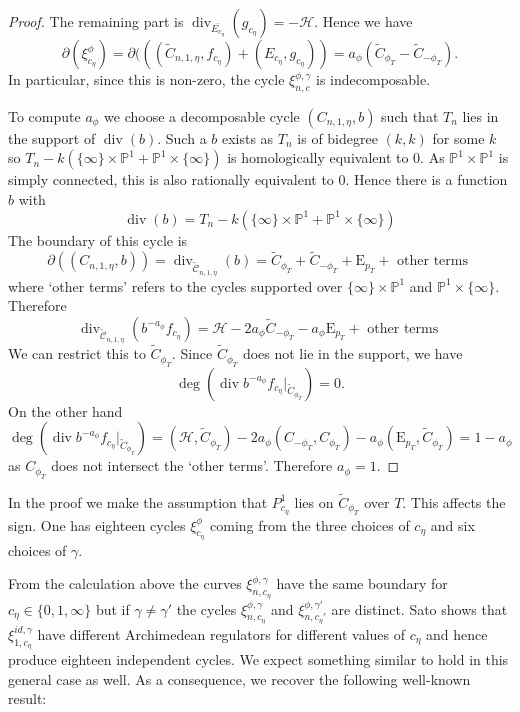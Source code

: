 \documentclass[11pt,a4paper]{article}
\newcommand {\UH}{{\mathcal H}}
\newcommand {\CP}{{\mathds P}}
\newcommand {\RE}{{{\mathrm E}}}
\newcommand {\TCC}{\tilde{\mathcal C}}
\newcommand {\CPP}{\CP^1 \times \CP^1}
\newcommand{\TC}{\tilde{C}}
\def\div{\operatorname{div}}
\def\deg{\operatorname{deg}}
\begin{document}
\begin{proof}
The remaining part is $\div_{\bar{E_{c_{\eta}}}}(g_{c_{\eta}})=-\UH$. Hence we have 
%
$$\partial (\xi^{\phi}_{c_{\eta}})=\partial( ((\TC_{n,1,\eta},f_{c_{\eta}})+(E_{c_{\eta}},g_{c_{\eta}}))=a_{\phi}(\TC_{\phi_T}-\TC_{-\phi_T}).$$
%
In particular, since this is non-zero, the cycle $\xi^{\phi,\gamma}_{n,c}$ is indecomposable. 
 
To compute $a_{\phi}$ we choose a decomposable cycle $(C_{n,1,\eta},b)$ such that $T_n$ lies in the support of $\div(b)$. Such a $b$ exists as $T_n$ is of bidegree $(k,k)$ for some $k$ so $T_n-k(\{\infty\} \times \CP^1+\CP^1 \times \{\infty \})$ is homologically equivalent to $0$. As $\CPP$ is simply connected, this is also rationally equivalent to $0$. Hence there is a function $b$ with 
%
$$\div(b)=T_n-k(\{\infty\} \times \CP^1+\CP^1 \times \{\infty \})$$
%
The boundary of this cycle is 
	$$\partial ((C_{n,1,\eta},b))=\div_{\TCC_{n,1,\eta}} (b)=\TC_{\phi_T}+\TC_{-\phi_T}+ \RE_{p_T} + \text { other terms }$$
	where `other terms' refers to the cycles supported over $\{\infty\} \times \CP^1$ and $\CP^1 \times \{\infty \}$. Therefore 
%
	$$\div_{\TCC_{n,1,\eta}} (b^{-a_{\phi}}f_{c_{\eta}})=\UH - 2 a_{\phi}\TC_{-\phi_T}- a_{\phi} \RE_{p_T} + \text{ other terms }$$ 
	We can restrict this to $\TC_{\phi_T}$. Since $\TC_{\phi_T}$ does not lie in the support, we have 
	$$\deg(\div b^{-a_{\phi}}f_{c_{\eta}}|_{\TC_{\phi_T}})=0.$$
	On the other hand 
	$$\deg(\div b^{-a_{\phi}}f_{c_{\eta}}|_{\TC_{\phi_T}}) = (\UH,\TC_{\phi_T}) -2a_{\phi}(C_{-\phi_T},C_{\phi_T})- a_{\phi}(\RE_{p_T},\TC_{{\phi_T}}) = 1-a_{\phi}$$
	as $C_{\phi_T}$ does not intersect the `other terms'. Therefore $a_{\phi}=1$.
\end{proof}

In the proof we make the assumption that $P^1_{c_{\eta}}$ lies on $\TC_{\phi_T}$ over $T$. This affects the sign. One has eighteen cycles $\xi_{c_{\eta}}^{\phi}$ coming from the three choices of $c_{\eta}$ and six choices of $\gamma$. 





From the calculation above the curves $\xi_{n,c_{\eta}}^{\phi,\gamma}$ have the same boundary for $c_{\eta} \in \{0,1,\infty\}$ but if $\gamma \neq \gamma'$ the cycles  $\xi_{n,c_{\eta}}^{\phi,\gamma}$ and $\xi_{n,c_{\eta}'}^{\phi,\gamma'}$ are distinct. Sato shows that $\xi_{1,c_{\eta}}^{id,\gamma}$ have different Archimedean regulators for different values of $c_{\eta}$ and hence produce eighteen independent cycles. We expect something similar to hold in this general case as well. As a consequence, we recover the following well-known result:
\end{document}

